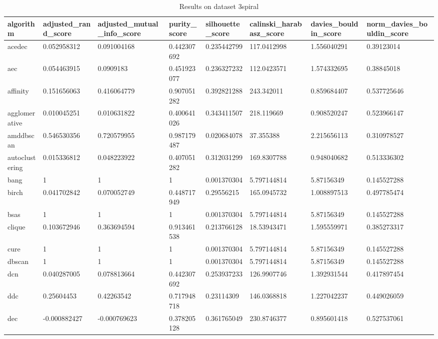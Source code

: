 \clearpage

\begin{table}[H]
\centering
\caption{Results on dataset 3spiral}
\label{S53_Table}
\begin{tabular}{|l|l|l|l|l|l|l|l|}
\hline
algorithm & adjusted\_rand\_score & adjusted\_mutual\_info\_score & purity\_score & silhouette\_score & calinski\_harabasz\_score & davies\_bouldin\_score & norm\_davies\_bouldin\_score \\
\hline
acedec & 0.052958312 & 0.091004168 & 0.442307692 & 0.235442799 & 117.0412998 & 1.556040291 & 0.39123014 \\
\hline
aec & 0.054463915 & 0.0909183 & 0.451923077 & 0.236327232 & 112.0423571 & 1.574332695 & 0.38845018 \\
\hline
affinity & 0.151656063 & 0.416064779 & 0.907051282 & 0.392821288 & 243.342011 & 0.859684407 & 0.537725646 \\
\hline
agglomerative & 0.010045251 & 0.010631822 & 0.400641026 & 0.343411507 & 218.119669 & 0.908520247 & 0.523966147 \\
\hline
amddbscan & 0.546530356 & 0.720579955 & 0.987179487 & 0.020684078 & 37.355388 & 2.215656113 & 0.310978527 \\
\hline
autoclustering & 0.015336812 & 0.048223922 & 0.407051282 & 0.312031299 & 169.8307788 & 0.948040682 & 0.513336302 \\
\hline
bang & 1 & 1 & 1 & 0.001370304 & 5.797144814 & 5.87156349 & 0.145527288 \\
\hline
birch & 0.041702842 & 0.070052749 & 0.448717949 & 0.29556215 & 165.0945732 & 1.008897513 & 0.497785474 \\
\hline
bsas & 1 & 1 & 1 & 0.001370304 & 5.797144814 & 5.87156349 & 0.145527288 \\
\hline
clique & 0.103672946 & 0.363694594 & 0.913461538 & 0.213766128 & 18.53943471 & 1.595559971 & 0.385273317 \\
\hline
cure & 1 & 1 & 1 & 0.001370304 & 5.797144814 & 5.87156349 & 0.145527288 \\
\hline
dbscan & 1 & 1 & 1 & 0.001370304 & 5.797144814 & 5.87156349 & 0.145527288 \\
\hline
dcn & 0.040287005 & 0.078813664 & 0.442307692 & 0.253937233 & 126.9907746 & 1.392931544 & 0.417897454 \\
\hline
ddc & 0.25604453 & 0.42263542 & 0.717948718 & 0.23114309 & 146.0368818 & 1.227042237 & 0.449026059 \\
\hline
dec & -0.000882427 & -0.000769623 & 0.378205128 & 0.361765049 & 230.8746377 & 0.895601418 & 0.527537061 \\

\end{tabular}
\end{table}

